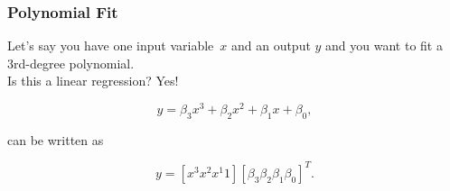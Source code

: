 \begin{frame}[fragile]
\frametitle{Polynomial Fit}

Let's say you have one input variable~$x$ and an output $y$ and you want to fit a 3rd-degree polynomial.\\
Is this a linear regression?
\pause
Yes!

\[
y = \beta_3 x^3 + \beta_2 x^2 + \beta_1 x + \beta_0,
\]

can be written as

\[
y = [ x^3 x^2 x^1 1] [\beta_3 \beta_2 \beta_1 \beta_0 ]^{T}.
\]
\end{frame}


